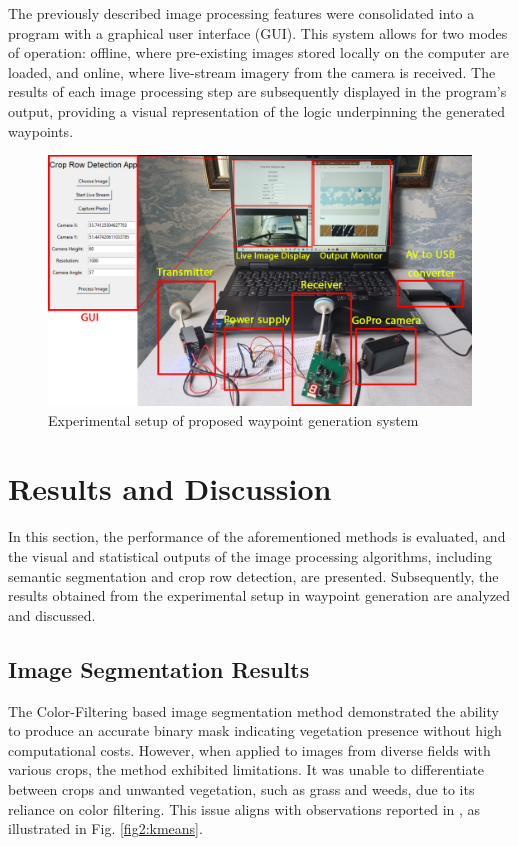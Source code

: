 \documentclass[conference]{IEEEtran}
\begin{document}
	The previously described image processing features were consolidated into a program with a graphical user interface (GUI). This system allows for two modes of operation: offline, where pre-existing images stored locally on the computer are loaded, and online, where live-stream imagery from the camera is received. The results of each image processing step are subsequently displayed in the program's output, providing a visual representation of the logic underpinning the generated waypoints.
	
	
	
	
	\begin{figure}[t]
		\includegraphics[width=\linewidth]{Setup of experiment.png}
		\caption{Experimental setup of proposed waypoint generation system}
		\label{EXP}
	\end{figure}
	
	\section{Results and Discussion}\label{Results and Discussion}
	
	In this section, the performance of the aforementioned methods is evaluated, and the visual and statistical outputs of the image processing algorithms, including semantic segmentation and crop row detection, are presented. Subsequently, the results obtained from the experimental setup in waypoint generation are analyzed and discussed.
	\subsection{Image Segmentation Results}
	
	The Color-Filtering based image segmentation method demonstrated the ability to produce an accurate binary mask indicating vegetation presence without high computational costs. However, when applied to images from diverse fields with various crops, the method exhibited limitations. It was unable to differentiate between crops and unwanted vegetation, such as grass and weeds, due to its reliance on color filtering. This issue aligns with observations reported in \cite{b5}, as illustrated in Fig.
	\ref{fig2:kmeans}.
	
\end{document}
